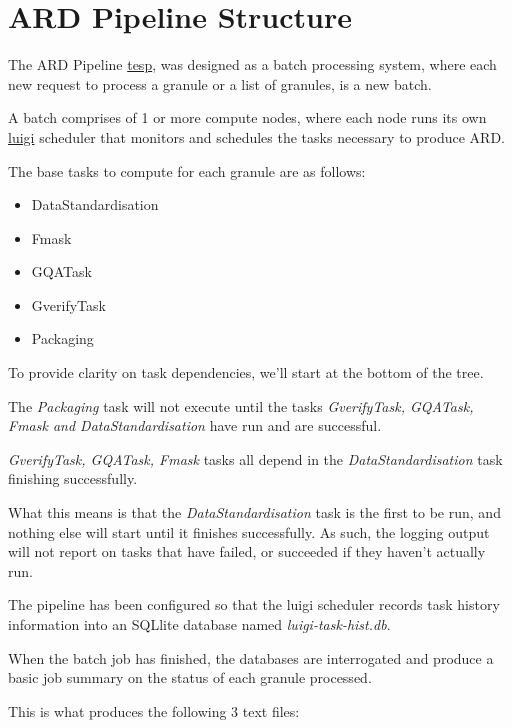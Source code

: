 \documentclass[a4paper,oneside,titlepage]{article}
\begin{document}
  \section{ARD Pipeline Structure}

    \begin{flushleft}
      The ARD Pipeline \href{https://github.com/OpenDataCubePipelines/tesp}{tesp}, was designed as a batch processing system, where each new request to process a granule or a list of granules, is a new batch. \par
      A batch comprises of 1 or more compute nodes, where each node runs its own \href{https://luigi.readthedocs.io/en/stable/}{luigi} scheduler that monitors and schedules the tasks necessary to produce ARD. \par
      The base tasks to compute for each granule are as follows:
    \end{flushleft}

    \begin{itemize}
      \item DataStandardisation
      \item Fmask
      \item GQATask
      \item GverifyTask
      \item Packaging
    \end{itemize}

    \begin{flushleft}
      To provide clarity on task dependencies, we'll start at the bottom of the tree. \par
      The \textit{Packaging} task will not execute until the tasks \textit{GverifyTask, GQATask, Fmask and DataStandardisation} have run and are successful. \par
      \textit{GverifyTask, GQATask, Fmask} tasks all depend in the \textit{DataStandardisation} task finishing successfully. \par
      What this means is that the \textit{DataStandardisation} task is the first to be run, and nothing else will start until it finishes successfully. As such, the logging output will not report on tasks that have failed, or succeeded if they haven't actually run.
    \end{flushleft}

    \begin{flushleft}
      The pipeline has been configured so that the luigi scheduler records task history information into an SQLlite database named \textit{luigi-task-hist.db}. \par
      When the batch job has finished, the databases are interrogated and produce a basic job summary on the status of each granule processed. \par
      This is what produces the following 3 text files:
    \end{flushleft}
\end{document}
